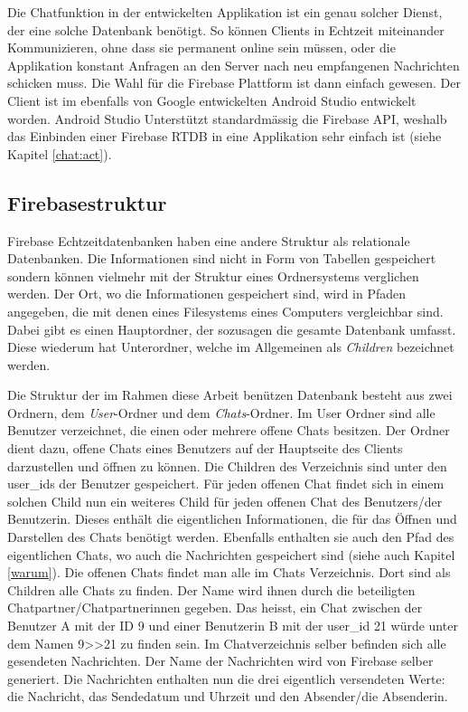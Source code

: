 \documentclass[a4paper,11pt]{report}
\begin{document}
				Die Chatfunktion in der entwickelten Applikation ist ein genau solcher Dienst, der eine solche Datenbank benötigt. So können Clients in Echtzeit miteinander Kommunizieren, ohne dass sie permanent online sein müssen, oder die Applikation konstant Anfragen an den Server nach neu empfangenen Nachrichten schicken muss. Die Wahl für die Firebase Plattform ist dann einfach gewesen. Der Client ist im ebenfalls von Google entwickelten Android Studio entwickelt worden. Android Studio Unterstützt standardmässig die Firebase API, weshalb das Einbinden einer Firebase RTDB in eine Applikation sehr einfach ist (siehe Kapitel \ref{chat:act}).
				
				\subsection{Firebasestruktur}
				Firebase Echtzeitdatenbanken haben eine andere Struktur als relationale Datenbanken. Die Informationen sind nicht in Form von Tabellen gespeichert sondern können vielmehr mit der Struktur eines Ordnersystems verglichen werden. Der Ort, wo die Informationen gespeichert sind, wird in Pfaden angegeben, die mit denen eines Filesystems eines Computers vergleichbar sind. Dabei gibt es einen Hauptordner, der sozusagen die gesamte Datenbank umfasst. Diese wiederum hat Unterordner, welche im Allgemeinen als \emph{Children} bezeichnet werden.
				
				Die Struktur der im Rahmen diese Arbeit benützen Datenbank besteht aus zwei Ordnern, dem \emph{User}-Ordner und dem \emph{Chats}-Ordner. Im User Ordner	sind alle Benutzer verzeichnet, die einen oder mehrere offene Chats besitzen. Der Ordner dient dazu, offene Chats eines Benutzers auf der Hauptseite des Clients darzustellen und öffnen zu können. Die Children des Verzeichnis sind unter den user\_ids der Benutzer gespeichert. Für jeden offenen Chat findet sich in einem solchen Child nun ein weiteres Child für jeden offenen Chat des Benutzers/der Benutzerin. Dieses enthält die eigentlichen Informationen, die für das Öffnen und Darstellen des Chats benötigt werden. Ebenfalls enthalten sie auch den Pfad des eigentlichen Chats, wo auch die Nachrichten gespeichert sind (siehe auch Kapitel \ref{warum}). Die offenen Chats findet man alle im Chats Verzeichnis. Dort sind als Children alle Chats zu finden. Der Name wird ihnen durch die beteiligten Chatpartner/Chatpartnerinnen gegeben. Das heisst, ein Chat zwischen der Benutzer A mit der ID 9 und einer Benutzerin B mit der user\_id 21 würde unter dem Namen 9\textgreater\textgreater21 zu finden sein. Im Chatverzeichnis selber befinden sich alle gesendeten Nachrichten. Der Name der Nachrichten wird von Firebase selber generiert. Die Nachrichten enthalten nun die drei eigentlich versendeten Werte: die Nachricht, das Sendedatum und Uhrzeit und den Absender/die Absenderin.
				
\end{document}
